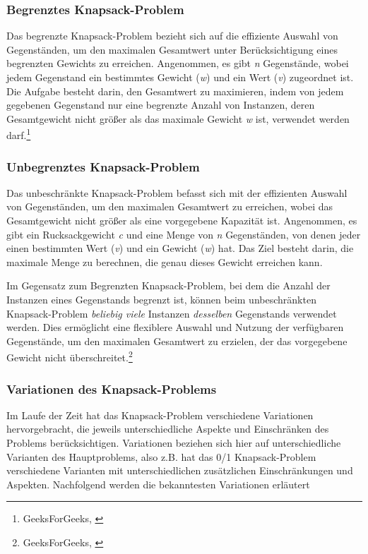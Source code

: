 \begin{itemize}
\subsubsection*{Begrenztes Knapsack-Problem}
Das begrenzte Knapsack-Problem bezieht sich auf die effiziente Auswahl von Gegenständen, um den maximalen Gesamtwert
unter Berücksichtigung eines begrenzten Gewichts zu erreichen. Angenommen, es gibt \textit{n} Gegenstände, wobei jedem
Gegenstand ein bestimmtes Gewicht (\textit{w}) und ein Wert (\textit{v}) zugeordnet ist. Die Aufgabe besteht darin, den
Gesamtwert zu maximieren, indem von jedem gegebenen Gegenstand nur eine begrenzte Anzahl von Instanzen, deren Gesamtgewicht
nicht größer als das maximale Gewicht \textit{w} ist, verwendet werden darf.\footnote{GeeksForGeeks, \cite{Bounded Knapsack Problem}}

\subsubsection*{Unbegrenztes Knapsack-Problem}
Das unbeschränkte Knapsack-Problem befasst sich mit der effizienten Auswahl von Gegenständen, um den maximalen Gesamtwert
zu erreichen, wobei das Gesamtgewicht nicht größer als eine vorgegebene Kapazität ist. Angenommen, es gibt ein Rucksackgewicht
\textit{c} und eine Menge von \textit{n} Gegenständen, von denen jeder einen bestimmten Wert (\textit{v}) und ein
Gewicht (\textit{w}) hat. Das Ziel besteht darin, die maximale Menge zu berechnen, die genau dieses Gewicht erreichen kann.

Im Gegensatz zum Begrenzten Knapsack-Problem, bei dem die Anzahl der Instanzen eines Gegenstands begrenzt ist, können
beim unbeschränkten Knapsack-Problem \textit{beliebig viele} Instanzen \textit{desselben} Gegenstands verwendet werden.
Dies ermöglicht eine flexiblere Auswahl und Nutzung der verfügbaren Gegenstände, um den maximalen Gesamtwert zu erzielen,
der das vorgegebene Gewicht nicht überschreitet.\footnote{GeeksForGeeks, \cite{Unbounded Knapsack}}

\subsubsection{Variationen des Knapsack-Problems}
Im Laufe der Zeit hat das Knapsack-Problem verschiedene Variationen hervorgebracht, die jeweils unterschiedliche Aspekte
und Einschränken des Problems berücksichtigen. Variationen beziehen sich hier auf unterschiedliche Varianten des Hauptproblems,
also z.B. hat das 0/1 Knapsack-Problem verschiedene Varianten mit unterschiedlichen zusätzlichen Einschränkungen und
Aspekten. Nachfolgend werden die bekanntesten Variationen erläutert


\end{itemize}
